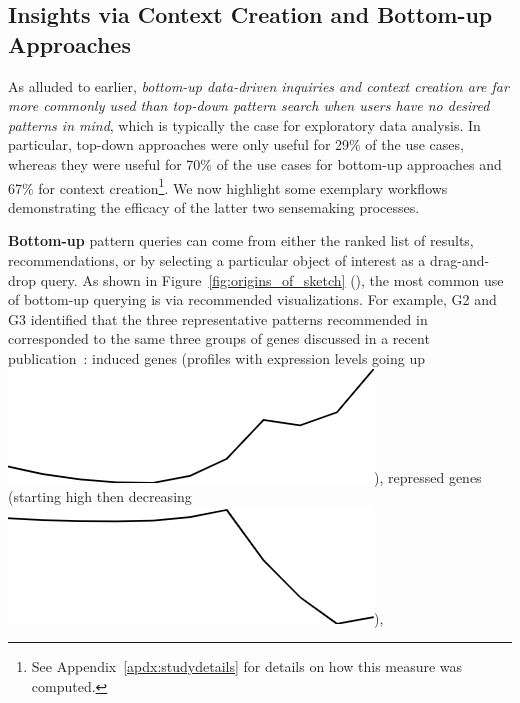  \subsection{Insights via Context Creation and Bottom-up Approaches}%
 \par As alluded to earlier,
 \emph{bottom-up data-driven inquiries
 and context creation are far more commonly
 used than top-down pattern search
 when users have no desired patterns in mind},
 which is typically the case for exploratory data analysis.
 In particular, top-down approaches were only useful for 29\% of the use cases,
 whereas they were useful for 70\% of the use cases
 for bottom-up approaches and 67\%
 for context creation\footnote{See Appendix~\ref{apdx:studydetails} for details on how this measure was computed.}. We now highlight some exemplary workflows demonstrating the efficacy of the latter two sensemaking processes.
 \par \textbf{Bottom-up }pattern queries can come from either
 the ranked list of results,
 recommendations, or by selecting a
 particular object of interest as a drag-and-drop query. As shown in Figure~\ref{fig:origins_of_sketch} (),
 the most common use of bottom-up querying
 is via recommended visualizations. For example, G2 and G3 identified that
 the three representative patterns
 recommended in \zvpp corresponded
 to the same three groups of genes discussed
 in a recent publication~\cite{Gloss2017}:
 induced genes (profiles with expression levels going up \includegraphics[width=2\baselineskip,keepaspectratio]{figures/induced.png}),
 repressed genes (starting high then decreasing \includegraphics[width=2\baselineskip,keepaspectratio]{figures/repressed.png}),
